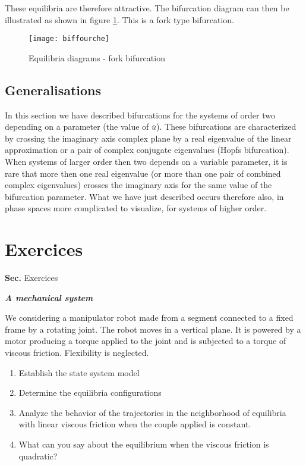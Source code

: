 These equilibria are therefore attractive. The bifurcation diagram can then
be illustrated as shown in figure \ref{fig:biffourche}. This is a fork type bifurcation.

\begin{figure}[htbp] 
   \centering
   \texttt{[image: biffourche]} 
   \caption{Equilibria diagrams - fork bifurcation}
   \label{fig:biffourche}
\end{figure}
 
\subsection{Generalisations}

In this section we have described bifurcations
for the systems of order two depending on a parameter (the value of $\bar u$). 
These bifurcations are characterized by crossing the imaginary axis
complex plane by a real eigenvalue of the linear approximation or a
pair of complex conjugate eigenvalues (Hopfs bifurcation). When
systems of larger order then two depends on a variable parameter, it is rare
that more then one real eigenvalue (or more than one pair of combined complex eigenvalues) 
crosses the imaginary axis for the same value of the bifurcation parameter. 
What we have just described occurs therefore also, in phase spaces
more complicated to visualize, for systems of higher order.

\newpage
\section{Exercices}
{{\bf Sec. \thesection}\hfill Exercices
\hspace*{5mm}}
 
\begin{exercice} {\bf \em A mechanical system}

We considering a manipulator robot made from a segment connected to a fixed frame by a rotating joint. 
The robot moves in a vertical plane. It is powered by a motor producing a torque
applied to the joint and is subjected to a torque of viscous friction. Flexibility is neglected.

\begin{enumerate}
\item Establish the state system model
\item Determine the equilibria configurations
\item Analyze the behavior of the trajectories in the neighborhood of
equilibria with linear viscous friction when the couple
applied is constant.
\item What can you say about the equilibrium when the viscous friction
is quadratic?
\end{enumerate}
\end{exercice}
\vv

